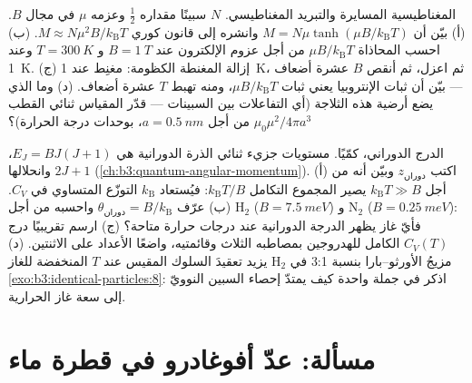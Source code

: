 \begin{exercise}[$\star\star\star$]\label{exo:b3:canonical-ensemble:11}
المغناطيسية المسايرة والتبريد المغناطيسي. $N$ سبينًا مقداره $\tfrac12$ وعزمه
$\mu$ في مجال $B$. (أ) بيّن أن $M = N\mu\tanh(\mu B/k_{\text{B}}T)$
وانشره إلى قانون كوري $M \approx N\mu^2B/k_{\text{B}}T$. (ب)
احسب المحاذاة $\mu B/k_{\text{B}}T$ من أجل عزوم الإلكترون
عند $B = \qty{1}{T}$ و $T = \qty{300}{K}$ وعند \qty{1}{K}. (ج)
إزالة المغنطة الكظومة: مغنِط عند \qty{1}{K}، ثم اعزل، ثم
أنقص $B$ عشرة أضعاف --- بيّن أن ثبات الإنتروبيا يعني ثبات
$\mu B/k_{\text{B}}T$، ومنه تهبط $T$ عشرة أضعاف. (د) وما الذي يضع
أرضية هذه الثلاجة (أي التفاعلات بين السبينات ---
قدّر المقياس ثنائي القطب $\mu_0\mu^2/4\pi a^3$ من أجل $a =
\qty{0.5}{nm}$، بوحدات درجة الحرارة)؟
\end{exercise}

\begin{exercise}[$\star\star\star$]\label{exo:b3:canonical-ensemble:12}
الدرج الدوراني، كمّيًا. مستويات جزيء ثنائي الذرة
الدورانية هي $E_J = BJ(J+1)$، وانحلالها $2J + 1$
(\cref{ch:b3:quantum-angular-momentum}). (أ) اكتب $z_{\text{دوران}}$
وبيّن أنه من أجل $k_{\text{B}}T \gg B$ يصير المجموع
التكامل $k_{\text{B}}T/B$: فيُستعاد $k_{\text{B}}$ التوزّع المتساوي في
$C_V$. (ب) عرّف $\theta_{\text{دوران}} =
B/k_{\text{B}}$ واحسبه من أجل H$_2$ ($B = \qty{7.5}{meV}$) و
N$_2$ ($B = \qty{0.25}{meV}$): فأيّ غاز يظهر الدرجة الدورانية
عند درجات حرارة متاحة؟ (ج) ارسم تقريبيًا درج $C_V(T)$ الكامل للهدروجين
بمصاطبه الثلاث وقائمتيه، واضعًا الأعداد على الاثنتين. (د)
يزيد تعقيدَ السلوك المقيس عند $T$ المنخفضة للغاز H$_2$ مزيجُ
الأورثو--بارا بنسبة 3:1 في
\cref{exo:b3:identical-particles:8}: اذكر في جملة واحدة كيف
يمتدّ إحصاء السبين النوويّ إلى سعة غاز الحرارية.
\end{exercise}

\section{مسألة: عدّ أفوغادرو في قطرة ماء}

